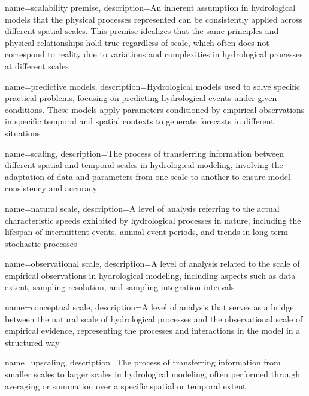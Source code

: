 {
    name=scalability premise,
    description={An inherent assumption in hydrological models that the physical processes represented can be consistently applied across different spatial scales. This premise idealizes that the same principles and physical relationships hold true regardless of scale, which often does not correspond to reality due to variations and complexities in hydrological processes at different scales}
}

{
    name=predictive models,
    description={Hydrological models used to solve specific practical problems, focusing on predicting hydrological events under given conditions. These models apply parameters conditioned by empirical observations in specific temporal and spatial contexts to generate forecasts in different situations}
}

{
    name=scaling,
    description={The process of transferring information between different spatial and temporal scales in hydrological modeling, involving the adaptation of data and parameters from one scale to another to ensure model consistency and accuracy}
}

{
    name=natural scale,
    description={A level of analysis referring to the actual characteristic speeds exhibited by hydrological processes in nature, including the lifespan of intermittent events, annual event periods, and trends in long-term stochastic processes}
}

{
    name=observational scale,
    description={A level of analysis related to the scale of empirical observations in hydrological modeling, including aspects such as data extent, sampling resolution, and sampling integration intervals}
}

{
    name=conceptual scale,
    description={A level of analysis that serves as a bridge between the natural scale of hydrological processes and the observational scale of empirical evidence, representing the processes and interactions in the model in a structured way}
}

{
    name=upscaling,
    description={The process of transferring information from smaller scales to larger scales in hydrological modeling, often performed through averaging or summation over a specific spatial or temporal extent}
}


